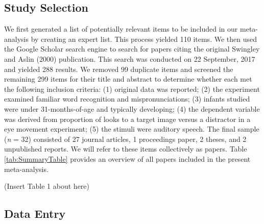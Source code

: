 \documentclass[man, noextraspace]{apa6}
\begin{document}
\hypertarget{study-selection}{%
\subsection{Study Selection}\label{study-selection}}

We first generated a list of potentially relevant items to be included in our meta-analysis by creating an expert list. This process yielded 110 items. We then used the Google Scholar search engine to search for papers citing the original Swingley and Aslin (2000) publication. This search was conducted on 22 September, 2017 and yielded 288 results. We removed 99 duplicate items and screened the remaining 299 items for their title and abstract to determine whether each met the following inclusion criteria: (1) original data was reported; (2) the experiment examined familiar word recognition and mispronunciations; (3) infants studied were under 31-months-of-age and typically developing; (4) the dependent variable was derived from proportion of looks to a target image versus a distractor in a eye movement experiment; (5) the stimuli were auditory speech. The final sample (\emph{n} = 32) consisted of 27 journal articles, 1 proceedings paper, 2 theses, and 2 unpublished reports. We will refer to these items collectively as papers. Table \ref{tab:SummaryTable} provides an overview of all papers included in the present meta-analysis.

(Insert Table 1 about here)

\hypertarget{data-entry}{%
\subsection{Data Entry}\label{data-entry}}
\end{document}
